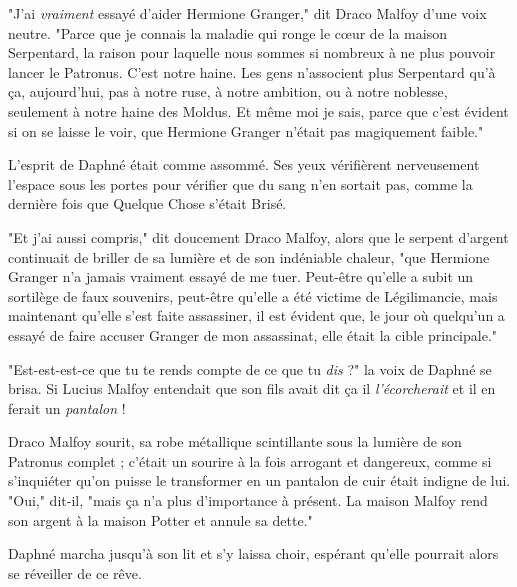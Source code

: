 "J'ai \emph{vraiment}  essayé d'aider Hermione Granger," dit Draco Malfoy d'une voix neutre. "Parce que je connais la maladie qui ronge le cœur de la maison Serpentard, la raison pour laquelle nous sommes si nombreux à ne plus pouvoir lancer le Patronus. C'est notre haine. Les gens n'associent plus Serpentard qu'à ça, aujourd'hui, pas à notre ruse, à notre ambition, ou à notre noblesse, seulement à notre haine des Moldus. Et même moi je sais, parce que c'est évident si on se laisse le voir, que Hermione Granger n'était pas magiquement faible."

L'esprit de Daphné était comme assommé. Ses yeux vérifièrent nerveusement l'espace sous les portes pour vérifier que du sang n'en sortait pas, comme la dernière fois que Quelque Chose s'était Brisé.

"Et j'ai aussi compris," dit doucement Draco Malfoy, alors que le serpent d'argent continuait de briller de sa lumière et de son indéniable chaleur, "que Hermione Granger n'a jamais vraiment essayé de me tuer. Peut-être qu'elle a subit un sortilège de faux souvenirs, peut-être qu'elle a été victime de Légilimancie, mais maintenant qu'elle s'est faite assassiner, il est évident que, le jour où quelqu'un a essayé de faire accuser Granger de mon assassinat, elle était la cible principale."

"Est-est-est-ce que tu te rends compte de ce que tu \emph{dis}  ?" la voix de Daphné se brisa. Si Lucius Malfoy entendait que son fils avait dit ça il \emph{l'écorcherait}  et il en ferait un \emph{pantalon}  !

Draco Malfoy sourit, sa robe métallique scintillante sous la lumière de son Patronus complet ; c'était un sourire à la fois arrogant et dangereux, comme si s'inquiéter qu'on puisse le transformer en un pantalon de cuir était indigne de lui. "Oui," dit-il, "mais ça n'a plus d'importance à présent. La maison Malfoy rend son argent à la maison Potter et annule sa dette."

Daphné marcha jusqu'à son lit et s'y laissa choir, espérant qu'elle pourrait alors se réveiller de ce rêve.

